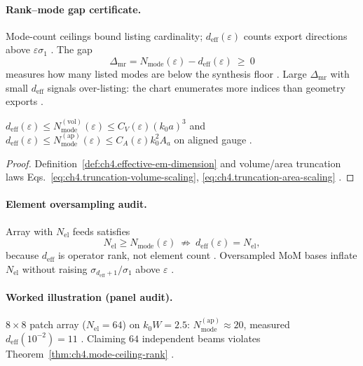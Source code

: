
\paragraph{Rank--mode gap certificate.}
Mode-count ceilings bound listing cardinality; \(d_{\mathrm{eff}}(\varepsilon)\) counts export directions above \(\varepsilon\sigma_{1}\)
\cite{hansen1988,harrington2001,stratton1941}. The gap
\begin{equation}
\label{eq:ch4.mode-rank-gap}
\Delta_{\mathrm{mr}}=N_{\mathrm{mode}}(\varepsilon)-d_{\mathrm{eff}}(\varepsilon)\ \ge\ 0
\end{equation}
measures how many listed modes are below the synthesis floor \cite{devaney2004,hansen1988}. Large \(\Delta_{\mathrm{mr}}\) with small
\(d_{\mathrm{eff}}\) signals over-listing: the chart enumerates more indices than geometry exports \cite{stratton1941,harrington2001}.

\begin{theorem}
\label{thm:ch4.mode-ceiling-rank}
\(d_{\mathrm{eff}}(\varepsilon)\le N_{\mathrm{mode}}^{\mathrm{(vol)}}(\varepsilon)\le C_{V}(\varepsilon)(k_{0}a)^{3}\) and
\(d_{\mathrm{eff}}(\varepsilon)\le N_{\mathrm{mode}}^{\mathrm{(ap)}}(\varepsilon)\le C_{A}(\varepsilon)k_{0}^{2}A_{a}\) on aligned gauge
\cite{collin2001,jackson1999,hansen1988,harrington2001,stratton1941}.
\end{theorem}
\begin{proof}
Definition~\ref{def:ch4.effective-em-dimension} and volume/area truncation laws Eqs.~\eqref{eq:ch4.truncation-volume-scaling},
\eqref{eq:ch4.truncation-area-scaling} \cite{stratton1941,hansen1988}.
\end{proof}

\paragraph{Element oversampling audit.}
Array with \(N_{\mathrm{el}}\) feeds satisfies
\begin{equation}
\label{eq:ch4.element-mode-inequality}
N_{\mathrm{el}}\ge N_{\mathrm{mode}}(\varepsilon)\ \not\Rightarrow\ d_{\mathrm{eff}}(\varepsilon)=N_{\mathrm{el}},
\end{equation}
because \(d_{\mathrm{eff}}\) is operator rank, not element count \cite{collin2001,harrington2001,devaney2004}. Oversampled MoM bases inflate
\(N_{\mathrm{el}}\) without raising \(\sigma_{d_{\mathrm{eff}}+1}/\sigma_{1}\) above \(\varepsilon\) \cite{hansen1988}.

\paragraph{Worked illustration (panel audit).}
\(8\times8\) patch array (\(N_{\mathrm{el}}=64\)) on \(k_{0}W=2.5\): \(N_{\mathrm{mode}}^{\mathrm{(ap)}}\approx20\), measured
\(d_{\mathrm{eff}}(10^{-2})=11\) \cite{collin2001,harrington2001,hansen1988}. Claiming \(64\) independent beams violates
Theorem~\ref{thm:ch4.mode-ceiling-rank} \cite{devaney2004}.

